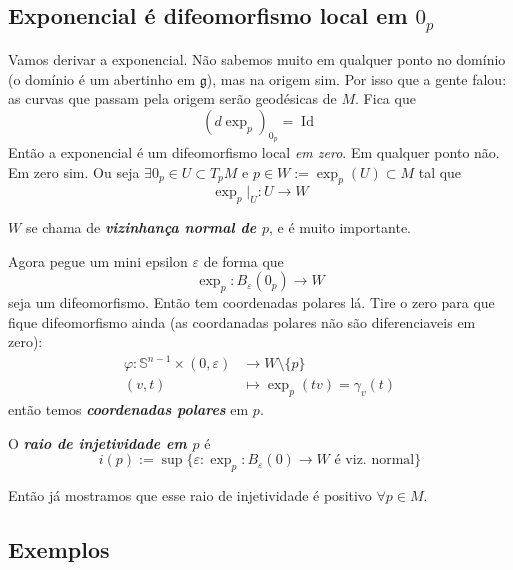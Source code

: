 \subsection{Exponencial é difeomorfismo local em \(0_p\)}

Vamos derivar a exponencial. Não sabemos muito em qualquer ponto no domínio (o domínio é um abertinho em \(\mathfrak{g}\)), mas na origem sim. Por isso que a gente falou: as curvas que passam pela origem serão geodésicas de \(M\). Fica que
\[(d \operatorname{exp}_p)_{0_p}=\operatorname{Id}\]
Então a exponencial é um difeomorfismo local \textit{em zero}. Em qualquer ponto não. Em zero sim. Ou seja \(\exists  0_p \in U \subset T_pM\) e \( p \in W:=\operatorname{exp}_p(U) \subset M\) tal que
\[\operatorname{exp}_p |_{U}:U \to W\]
\begin{defn}\leavevmode
\(W\) se chama de \textit{\textbf{vizinhança normal de \(p\)}}, e é muito importante.
\end{defn}
Agora pegue um mini epsilon \(\varepsilon\) de forma que
\[\operatorname{exp}_p:B_\varepsilon(0_p) \longrightarrow W\]
seja um difeomorfismo. Então tem coordenadas polares lá. Tire o zero para que fique difeomorfismo ainda (as coordanadas polares não são diferenciaveis em zero):
\begin{align*}
	\varphi: \mathbb{S}^{n-1}\times(0,\varepsilon) &\longrightarrow W\setminus\{p\} \\
	(v,t) &\longmapsto \operatorname{exp}_p(tv)=\gamma_v(t)
\end{align*}
então temos \textit{\textbf{coordenadas polares}} em \(p\).

\begin{defn}\leavevmode
O \textit{\textbf{raio de injetividade em \(p\)}} é
\[i(p):=\operatorname{sup}\{\varepsilon:\operatorname{exp}_p:B_\varepsilon(0) \to W\text{ é viz. normal} \}\]
\end{defn}
Então já mostramos que esse raio de injetividade é positivo \(\forall  p \in M\).

\subsection{Exemplos}

